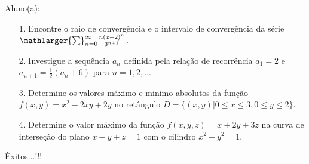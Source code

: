 \documentclass[oneside,a4paper,12pt]{article}
\begin{document}
     \begin{flushleft}
     	Aluno(a):
     \end{flushleft}
 
 \begin{itemize}
 	\item[1.]  Encontre o raio de convergência e o intervalo de convergência da série $\mathlarger{\sum}_{n=0}^{\infty} \frac{n(x+2)^{n}}{3^{n+1}}$.
 \end{itemize}
 \begin{itemize}
 	\item[2.] Investigue a sequência ${a_{n}}$ definida pela relação de recorrência $a_{1}=2$ e $a_{n+1}=\frac{1}{2}(a_{n}+6)$ para $n=1,2,...$  . 
 \end{itemize}
 \begin{itemize}
 	\item [3.] Determine os valores máximo e minimo absolutos da função $f(x,y)=x^{2}-2xy+2y$ no retângulo $D=\{(x,y)| 0\leq x \leq 3, 0\leq y \leq 2\}$.
 \end{itemize}
 \begin{itemize}
 	\item[4.] Determine o valor máximo da função $f(x,y,z)=x+2y+3z$ na curva de interseção do plano $x-y+z=1$ com o cilindro $x^{2}+y^{2}=1$.
 \end{itemize}
\flushbottom
\flushright
Êxitos...!!!
\end{document}
